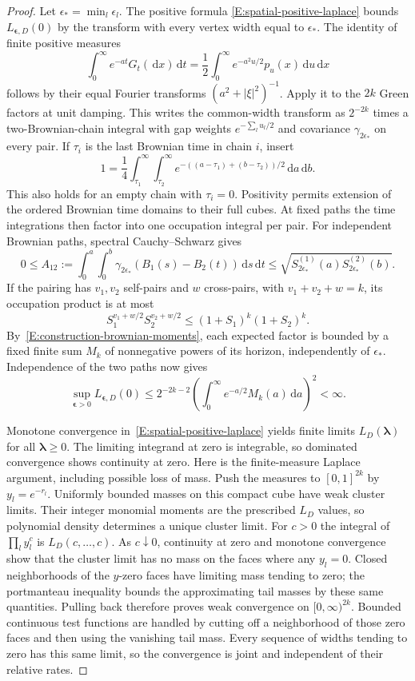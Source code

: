 \documentclass[12pt]{article}
\numberwithin{equation}{section}
\theoremstyle{definition}
\newcommand{\ud}{\,\mathrm{d}}
\begin{document}
\begin{proof}
  Let $\epsilon_* =\min_l\epsilon_l$. The positive formula
  \eqref{E:spatial-positive-laplace} bounds $L_{\boldsymbol\epsilon,D}(0)$
  by the transform with every vertex width equal to $\epsilon_*$.
  The identity of finite positive measures
  \[
    \int_0^\infty e^{-at}G_t(\ud x)\ud t
    =\frac12\int_0^\infty e^{-a^2u/2}p_u(x)\ud u\ud x
  \]
  follows by their equal Fourier transforms $(a^2+|\xi|^2)^{-1}$.
  Apply it to the $2k$ Green factors at unit damping. This writes the
  common-width transform as $2^{-2k}$ times a two-Brownian-chain
  integral with gap weights $e^{-\sum_l u_l/2}$ and covariance
  $\gamma_{2\epsilon_*}$ on every pair.
  If $\tau_i$ is the last Brownian time in chain $i$, insert
  \[
    1=\frac14\int_{\tau_1}^\infty\int_{\tau_2}^\infty
    e^{-((a-\tau_1)+(b-\tau_2))/2}\ud a\ud b.
  \]
  This also holds for an empty chain with $\tau_i=0$.
  Positivity permits extension of the ordered Brownian time domains to
  their full cubes. At fixed paths the time integrations then factor
  into one occupation integral per pair.
  For independent Brownian paths, spectral Cauchy--Schwarz gives
  \[
    0\le A_{12}:=\int_0^a\int_0^b
    \gamma_{2\epsilon_*}(B_1(s)-B_2(t))\ud s\ud t
    \le\sqrt{S_{2\epsilon_*}^{(1)}(a)S_{2\epsilon_*}^{(2)}(b)}.
  \]
  If the pairing has $v_1,v_2$ self-pairs and $w$ cross-pairs, with
  $v_1+v_2+w=k$, its occupation product is at most
  \[
    S_1^{v_1+w/2}S_2^{v_2+w/2}\le(1+S_1)^k(1+S_2)^k.
  \]
  By~\eqref{E:construction-brownian-moments}, each expected factor
  is bounded by a fixed finite sum $M_k$ of nonnegative powers of
  its horizon, independently
  of $\epsilon_*$. Independence of the two paths now gives
  \[
    \sup_{\boldsymbol\epsilon>0}L_{\boldsymbol\epsilon,D}(0)
    \le2^{-2k-2}\left(\int_0^\infty e^{-a/2}M_k(a)\ud a\right)^2<\infty.
  \]

  Monotone convergence in~\eqref{E:spatial-positive-laplace} yields
  finite limits $L_D(\boldsymbol\lambda)$ for all
  $\boldsymbol\lambda\ge0$. The limiting integrand at zero is integrable,
  so dominated convergence shows continuity at zero.
  Here is the finite-measure Laplace argument, including possible loss
  of mass. Push the measures to $[0,1]^{2k}$ by $y_l=e^{-r_l}$.
  Uniformly bounded masses on this compact cube have weak cluster limits.
  Their integer monomial moments are the prescribed $L_D$ values, so
  polynomial density determines a unique cluster limit. For $c>0$ the
  integral of $\prod_l y_l^c$ is $L_D(c,\ldots,c)$.
  As $c\downarrow0$, continuity at zero and monotone convergence show
  that the cluster limit has no mass on the faces where any $y_l=0$.
  Closed neighborhoods of the $y$-zero faces have limiting mass tending
  to zero; the portmanteau inequality bounds the approximating tail
  masses by these same quantities. Pulling back therefore proves weak
  convergence on $[0,\infty)^{2k}$.
  Bounded continuous test functions are handled by cutting off a
  neighborhood of those zero faces and then using the vanishing tail mass.
  Every sequence of widths tending to zero has this same limit, so
  the convergence is joint and independent of their relative rates.


\end{proof}
\end{document}
